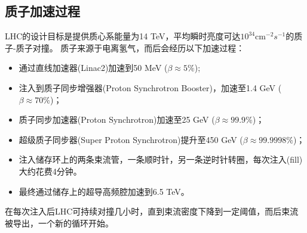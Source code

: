 \subsection{质子加速过程}
LHC的设计目标是提供质心系能量为14 TeV，平均瞬时亮度可达$10^{34} \text{cm}^{-2}s^{-1}$的质子-质子对撞。
质子来源于电离氢气，而后会经历以下加速过程：
\begin{itemize}
  \item 通过直线加速器(Linac2)加速到50 MeV ($\beta\approx5\%$);
  \item 注入到质子同步增强器(Proton Synchrotron Booster)，加速至1.4 GeV ($\beta\approx70\%$)；
  \item 质子同步加速器(Proton Synchrotron)加速至25 GeV ($\beta\approx99.9\%$)；
  \item 超级质子同步器(Super Proton Synchrotron)提升至450 GeV ($\beta\approx99.9998\%$)；
  \item 注入储存环上的两条束流管，一条顺时针，另一条逆时针转圈，每次注入(fill)大约花费4分钟。
  \item 最终通过储存上的超导高频腔加速到6.5 TeV。
\end{itemize}
在每次注入后LHC可持续对撞几小时，直到束流密度下降到一定阈值，而后束流被导出，一个新的循环开始。

